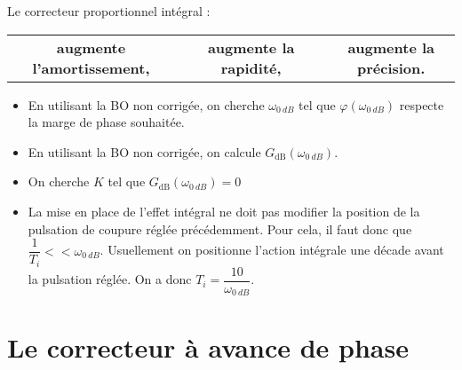 \begin{resultat}
Le correcteur proportionnel intégral : 
\begin{center}
\begin{tabular}{ccccc}
\textbf{augmente l'amortissement,} &&
\textbf{augmente la rapidité,} && 
\textbf{augmente la précision.} \\
\end{tabular}
\end{center}
\end{resultat}



\begin{methode}
\begin{itemize}
\item En utilisant la BO non corrigée, on cherche $\omega_{\SI{0}{dB}}$ tel que $\varphi(\omega_{\SI{0}{dB}})$ respecte la marge de phase souhaitée. 
\item En utilisant la BO non corrigée, on calcule $G_{\text{dB}}\left(\omega_{\SI{0}{dB}}\right)$. 
\item On cherche $K$ tel que $G_{\text{dB}}\left(\omega_{\SI{0}{dB}}\right)=0$
\item La mise en place de l'effet intégral ne doit pas modifier la position de la pulsation de coupure réglée précédemment. Pour cela, il faut donc que $\dfrac{1}{T_i}<< \omega_{\SI{0}{dB}}$. Usuellement on positionne l'action intégrale une décade avant la pulsation réglée. On a donc $T_i=\dfrac{10}{\omega_{\SI{0}{dB}}}$.
\end{itemize}

\end{methode}
\newpage

\section{Le correcteur à avance de phase}


